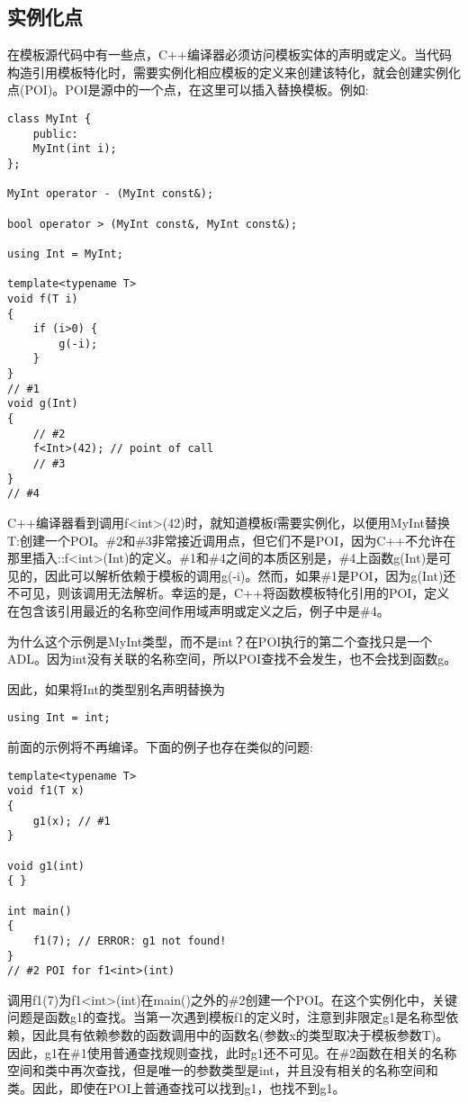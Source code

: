 \subsection{实例化点}

在模板源代码中有一些点，C++编译器必须访问模板实体的声明或定义。当代码构造引用模板特化时，需要实例化相应模板的定义来创建该特化，就会创建实例化点(POI)。POI是源中的一个点，在这里可以插入替换模板。例如:

\begin{lstlisting}[style=styleCXX]
class MyInt {
	public:
	MyInt(int i);
};

MyInt operator - (MyInt const&);

bool operator > (MyInt const&, MyInt const&);

using Int = MyInt;

template<typename T>
void f(T i)
{
	if (i>0) {
		g(-i);
	}
}
// #1
void g(Int)
{
	// #2
	f<Int>(42); // point of call
	// #3
}
// #4
\end{lstlisting}

C++编译器看到调用f<int>(42)时，就知道模板f需要实例化，以便用MyInt替换T:创建一个POI。\#2和\#3非常接近调用点，但它们不是POI，因为C++不允许在那里插入::f<int>(Int)的定义。\#1和\#4之间的本质区别是，\#4上函数g(Int)是可见的，因此可以解析依赖于模板的调用g(-i)。然而，如果\#1是POI，因为g(Int)还不可见，则该调用无法解析。幸运的是，C++将函数模板特化引用的POI，定义在包含该引用最近的名称空间作用域声明或定义之后，例子中是\#4。

为什么这个示例是MyInt类型，而不是int？在POI执行的第二个查找只是一个ADL。因为int没有关联的名称空间，所以POI查找不会发生，也不会找到函数g。

因此，如果将Int的类型别名声明替换为

\begin{lstlisting}[style=styleCXX]
using Int = int;
\end{lstlisting}

前面的示例将不再编译。下面的例子也存在类似的问题:

\begin{lstlisting}[style=styleCXX]
template<typename T>
void f1(T x)
{
	g1(x); // #1
}

void g1(int)
{ }

int main()
{
	f1(7); // ERROR: g1 not found!
}
// #2 POI for f1<int>(int)
\end{lstlisting}

调用f1(7)为f1<int>(int)在main()之外的\#2创建一个POI。在这个实例化中，关键问题是函数g1的查找。当第一次遇到模板f1的定义时，注意到非限定g1是名称型依赖，因此具有依赖参数的函数调用中的函数名(参数x的类型取决于模板参数T)。因此，g1在\#1使用普通查找规则查找，此时g1还不可见。在\#2函数在相关的名称空间和类中再次查找，但是唯一的参数类型是int，并且没有相关的名称空间和类。因此，即使在POI上普通查找可以找到g1，也找不到g1。

